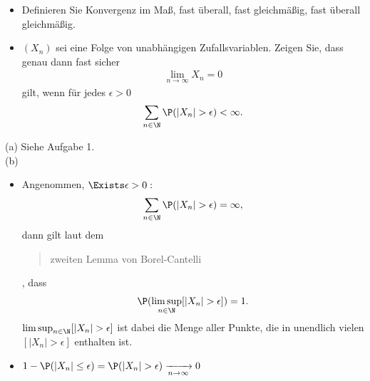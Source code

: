 \begin{exercise}

\phantom{}

\begin{itemize}
  \item[(a)] Definieren Sie Konvergenz im Maß, fast überall, fast gleichmäßig, fast überall gleichmäßig.
  \item[(b)] $(X_n)$ sei eine Folge von unabhängigen Zufallsvariablen. Zeigen Sie, dass genau dann fast sicher
  \begin{align*}
    \lim_{n \to \infty} X_n = 0
  \end{align*}
  gilt, wenn für jedes $\epsilon > 0$
  \begin{align*}
    \sum_{n \in \N} \P(|X_n| > \epsilon) < \infty.
  \end{align*}
\end{itemize}

\end{exercise}


\begin{solution}

(a) Siehe Aufgabe 1. \\

(b) \phantom{}

\begin{itemize}

  \item[\blockquote{$\Rightarrow$}:] Angenommen, $\Exists \epsilon > 0:$
  \begin{align*}
    \sum_{n \in \N} \P(|X_n| > \epsilon) = \infty,
  \end{align*}
  dann gilt laut dem \blockquote{zweiten Lemma von Borel-Cantelli}, dass
  \begin{align*}
    \P(\limsup_{n \in \N} [|X_n| > \epsilon]) = 1.
  \end{align*}
  $\limsup_{n \in \N} [|X_n| > \epsilon]$ ist dabei die Menge aller Punkte, die in unendlich vielen $[|X_n| > \epsilon]$ enthalten ist.

  \item[\blockquote{$\Leftarrow$}:]
  $1 - \P(|X_n| \leq \epsilon)
  =
  \P(|X_n| > \epsilon)
  \xrightarrow[n \to \infty]{} 0$

\end{itemize}

\end{solution}


